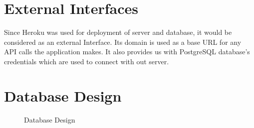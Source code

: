 \section{External Interfaces}
Since Heroku was used for deployment of server and database, it would be considered as an external Interface. Its domain is used as a base URL for any API calls the application makes. It also provides us with PostgreSQL database's credentials which are used to connect with out server.

\section{Database Design}
\noindent
\begin{figure}[H]
	\centering
	\caption{Database Design}
\end{figure}